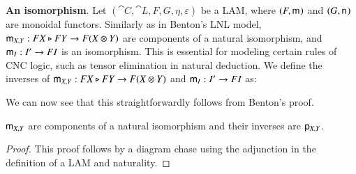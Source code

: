 \textbf{An isomorphism}. Let $(\cat{C},\cat{L},F,G,\eta,\varepsilon)$
be a LAM, where $(F,\mathsf{m}_{})$ and $(G,\mathsf{n}_{})$ are monoidal
functors. Similarly as in Benton's LNL model, $\mathsf{m}_{X,Y} : FX \triangleright FY
\rightarrow F(X \otimes Y)$ are components of a natural isomorphism, and
$\mathsf{m}_{I} : I' \rightarrow FI$ is an isomorphism. This is essential for modeling
certain rules of CNC logic, such as tensor elimination in natural
deduction.  We define the inverses of $\mathsf{m}_{X,Y}:FX\triangleright FY\rightarrow
F(X\otimes Y)$ and $\mathsf{m}_{I}:I'\rightarrow FI$ as:
\vspace{-20px}
We can now see that this straightforwardly follows from Benton's proof.

\begin{theorem}
  $\mathsf{m}_{X,Y}$ are components of a natural isomorphism and their inverses are $\mathsf{p}_{X,Y}$.
\end{theorem}
\begin{proof}
  This proof follows by a diagram chase using the adjunction in the
  definition of a LAM and naturality.
\end{proof}

